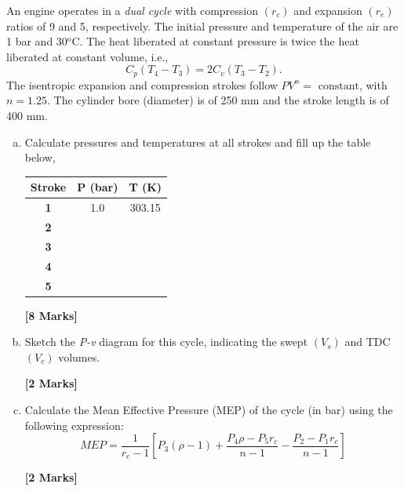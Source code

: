 \documentclass[calculator,steamtables,refrigeranttables,psychrometricchart,datasheet,sample]{exam}
\newcommand{\frc}{\displaystyle\frac}
\begin{document}
\begin{question}

An engine operates in a {\it dual cycle} with compression $\left(r_{c}\right)$ and expansion $\left(r_{e}\right)$ ratios of 9 and 5, respectively. The initial pressure and temperature of the air are 1 bar and 30$^{\text{o}}$C. The heat liberated at constant pressure is twice the heat liberated at constant volume, i.e.,
\begin{displaymath}
C_{p}\left(T_{4}-T_{3}\right)=2 C_{v}\left(T_{3}-T_{2}\right).
\end{displaymath}
The isentropic expansion and compression strokes follow $PV^{n}=\text{ constant}$, with $n=1.25$. The cylinder bore (diameter) is of 250 mm and the stroke length is of 400 mm. 
\begin{enumerate}[(a)]

\item Calculate pressures and temperatures at all strokes and fill up the table below,
\begin{center}
\begin{tabular}{||c |c |c ||}
\hline \hline
 {\bf Stroke}  &  {\bf P (bar)}   &  {\bf T (K)} \\
\hline\hline
{\bf 1 }       &     1.0          &    303.15    \\
\hline         
{\bf 2 }       &                  &             \\
\hline         
{\bf 3 }       &                  &             \\
\hline         
{\bf 4 }       &                  &             \\
\hline         
{\bf 5 }       &                  &             \\
\hline\hline         
\end{tabular}
\end{center}
\begin{flushright}
{\bf [8 Marks]}
\end{flushright}



\item Sketch the {\it P-v} diagram for this cycle, indicating the swept $\left(V_{s}\right)$ and TDC $\left(V_{c}\right)$ volumes.
\begin{flushright}
{\bf [2 Marks]}
\end{flushright} 

\item Calculate the Mean Effective Pressure (MEP) of the cycle (in bar) using the following expression:
\begin{displaymath}
MEP = \frc{1}{r_{c}-1} \left[ P_{3}\left(\rho-1\right) + \frc{P_{4}\rho-P_{5}r_{c}}{n-1} - \frc{P_{2}-P_{1}r_{c}}{n-1}\right]
\end{displaymath}
\begin{flushright}
{\bf [2 Marks]}
\end{flushright}


\end{enumerate}
\end{question}
\end{document}
